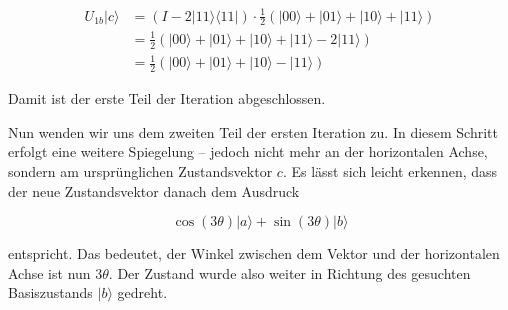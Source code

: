 \begin{align*}
U_{1b} |c\rangle &= (I - 2|11\rangle \langle 11|) \cdot \frac{1}{2}(|00\rangle + |01\rangle + |10\rangle + |11\rangle) \\
&= \frac{1}{2} \left( |00\rangle + |01\rangle + |10\rangle + |11\rangle - 2|11\rangle \right) \\
&= \frac{1}{2} (|00\rangle + |01\rangle + |10\rangle - |11\rangle)
\end{align*}

Damit ist der erste Teil der Iteration abgeschlossen.

Nun wenden wir uns dem zweiten Teil der ersten Iteration zu. In diesem Schritt erfolgt eine weitere Spiegelung – jedoch nicht mehr an der horizontalen Achse, sondern am ursprünglichen Zustandsvektor $c$. Es lässt sich leicht erkennen, dass der neue Zustandsvektor danach dem Ausdruck

$$
\cos(3\theta)|a\rangle + \sin(3\theta)|b\rangle
$$

\noindent entspricht. Das bedeutet, der Winkel zwischen dem Vektor und der horizontalen Achse ist nun $3\theta$. Der Zustand wurde also weiter in Richtung des gesuchten Basiszustands $|b\rangle$ gedreht.

